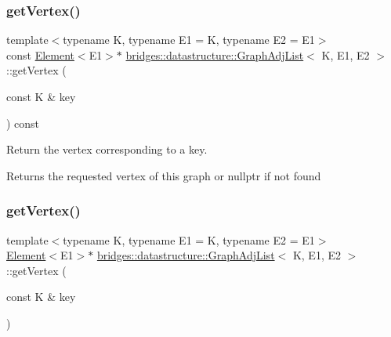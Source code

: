 \subsubsection{\texorpdfstring{get\+Vertex()}{getVertex()}\hspace{0.1cm}{\footnotesize\ttfamily [1/2]}}
{\footnotesize\ttfamily template$<$typename K, typename E1 = K, typename E2 = E1$>$ \\
const \hyperlink{classbridges_1_1datastructure_1_1_element}{Element}$<$E1$>$$\ast$ \hyperlink{classbridges_1_1datastructure_1_1_graph_adj_list}{bridges\+::datastructure\+::\+Graph\+Adj\+List}$<$ K, E1, E2 $>$\+::get\+Vertex (\begin{DoxyParamCaption}\item[{const K \&}]{key }\end{DoxyParamCaption}) const\hspace{0.3cm}{\ttfamily [inline]}}



Return the vertex corresponding to a key. 

\begin{DoxyReturn}{Returns}
the requested vertex of this graph or nullptr if not found 
\end{DoxyReturn}
\mbox{\label{classbridges_1_1datastructure_1_1_graph_adj_list_aa55482a035e233299d49874732113e6d}} 
\subsubsection{\texorpdfstring{get\+Vertex()}{getVertex()}\hspace{0.1cm}{\footnotesize\ttfamily [2/2]}}
{\footnotesize\ttfamily template$<$typename K, typename E1 = K, typename E2 = E1$>$ \\
\hyperlink{classbridges_1_1datastructure_1_1_element}{Element}$<$E1$>$$\ast$ \hyperlink{classbridges_1_1datastructure_1_1_graph_adj_list}{bridges\+::datastructure\+::\+Graph\+Adj\+List}$<$ K, E1, E2 $>$\+::get\+Vertex (\begin{DoxyParamCaption}\item[{const K \&}]{key }\end{DoxyParamCaption})\hspace{0.3cm}{\ttfamily [inline]}}

